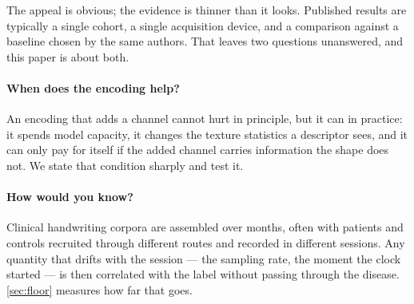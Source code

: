 \documentclass[10pt,a4paper]{article}
\begin{document}
The appeal is obvious; the evidence is thinner than it looks. Published results are typically a
single cohort, a single acquisition device, and a comparison against a baseline chosen by the same
authors. That leaves two questions unanswered, and this paper is about both.

\paragraph{When does the encoding help?} An encoding that adds a channel cannot hurt in principle,
but it can in practice: it spends model capacity, it changes the texture statistics a descriptor
sees, and it can only pay for itself if the added channel carries information the shape does not.
We state that condition sharply and test it.

\paragraph{How would you know?} Clinical handwriting corpora are assembled over months, often with
patients and controls recruited through different routes and recorded in different sessions. Any
quantity that drifts with the session --- the sampling rate, the moment the clock started --- is
then correlated with the label without passing through the disease. \cref{sec:floor} measures how
far that goes.
\end{document}
